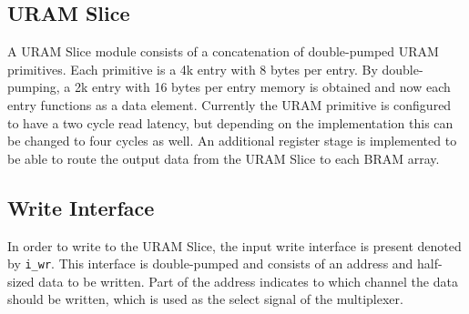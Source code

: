 \subsection{URAM Slice}
A URAM Slice module consists of a concatenation of double-pumped URAM primitives. Each primitive is a 4k entry with 8 bytes per entry. By double-pumping, a 2k entry with 16 bytes per entry memory is obtained and now each entry functions as a data element. Currently the URAM primitive is configured to have a two cycle read latency, but depending on the implementation this can be changed to four cycles as well. An additional register stage is implemented to be able to route the output data from the URAM Slice to each BRAM array.

\subsection{Write Interface}
In order to write to the URAM Slice, the input write interface is present denoted by \texttt{i\_wr}. This interface is double-pumped and consists of an address and half-sized data to be written. Part of the address indicates to which channel the data should be written, which is used as the select signal of the multiplexer.

